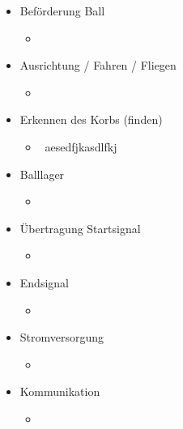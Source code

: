 \documentclass[a4paper,10pt,fleqn]{article}
\begin{document}
\begin{itemize}
    \item Beförderung Ball
    \begin{itemize}
        \item ~
    \end{itemize}
    \item Ausrichtung / Fahren / Fliegen
    \begin{itemize}
        \item ~
    \end{itemize}
    \item Erkennen des Korbs (finden)
    \begin{itemize}
        \item ~aesedfjkasdlfkj
    \end{itemize}
    \item Balllager
    \begin{itemize}
        \item ~
    \end{itemize}
    \item Übertragung Startsignal
    \begin{itemize}
        \item ~
    \end{itemize}
    \item Endsignal
    \begin{itemize}
        \item ~
    \end{itemize}
    \item Stromversorgung
    \begin{itemize}
        \item ~
    \end{itemize}
    \item Kommunikation
    \begin{itemize}
        \item ~
    \end{itemize}
\end{itemize}
\end{document}
